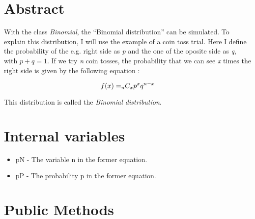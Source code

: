 %

\section{Abstract}

\noindent
With the class {\em Binomial}, the ``Binomial distribution'' can be
simulated. To explain this distribution, I will use the example of a
coin toss trial. Here I define the probability of the e.g. right side
as {\em p} and the one of the oposite side as {\em q}, with $p + q =
1$. If we try {\em n} coin tosses, the probability that we can see
{\em x} times the right side is given by the following equation :

\begin{equation}
f(x) = _n \hspace{-1mm} C_x p^x q^{n-x}
\end{equation}

\noindent
This distribution is called the {\em Binomial distribution}.

\vspace*{10mm}

\section{Internal variables}

\begin{itemize}
\item {pN - The variable n in the former equation.}
\item {pP - The probability p in the former equation.}
\end{itemize}


\vspace*{10mm}

\section{Public Methods}

